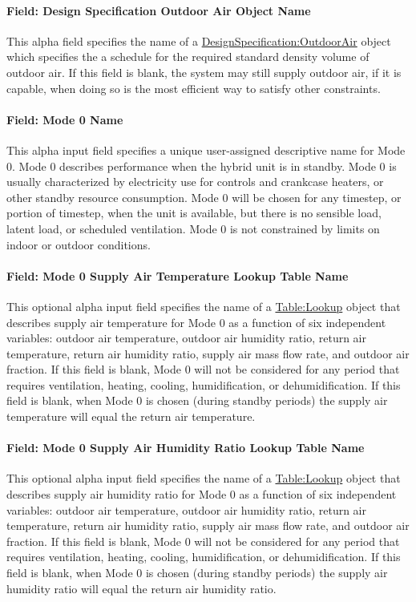\paragraph{Field: Design Specification Outdoor Air Object Name}
This alpha field specifies the name of a \hyperref[designspecificationoutdoorair]{DesignSpecification:OutdoorAir} object which specifies the a schedule for the required standard density volume of outdoor air. If this field is blank, the system may still supply outdoor air, if it is capable, when doing so is the most efficient way to satisfy other constraints.

\paragraph{Field: Mode 0 Name}
This alpha input field specifies a unique user-assigned descriptive name for Mode 0. Mode 0 describes performance when the hybrid unit is in standby. Mode 0 is usually characterized by electricity use for controls and crankcase heaters, or other standby resource consumption. Mode 0 will be chosen for any timestep, or portion of timestep, when the unit is available, but there is no sensible load, latent load, or scheduled ventilation. Mode 0 is not constrained by limits on indoor or outdoor conditions.

\paragraph{Field: Mode 0 Supply Air Temperature Lookup Table Name}
This optional alpha input field specifies the name of a \hyperref[tablelookup]{Table:Lookup} object that describes supply air temperature for Mode 0 as a function of six independent variables: outdoor air temperature, outdoor air humidity ratio, return air temperature, return air humidity ratio, supply air mass flow rate, and outdoor air fraction.  If this field is blank, Mode 0 will not be considered for any period that requires ventilation, heating, cooling, humidification, or dehumidification. If this field is blank, when Mode 0 is chosen (during standby periods) the supply air temperature will equal the return air temperature.

\paragraph{Field: Mode 0 Supply Air Humidity Ratio Lookup Table Name}
This optional alpha input field specifies the name of a \hyperref[tablelookup]{Table:Lookup} object that describes supply air humidity ratio for Mode 0 as a function of six independent variables: outdoor air temperature, outdoor air humidity ratio, return air temperature, return air humidity ratio, supply air mass flow rate, and outdoor air fraction. If this field is blank, Mode 0 will not be considered for any period that requires ventilation, heating, cooling, humidification, or dehumidification. If this field is blank, when Mode 0 is chosen (during standby periods) the supply air humidity ratio will equal the return air humidity ratio.

